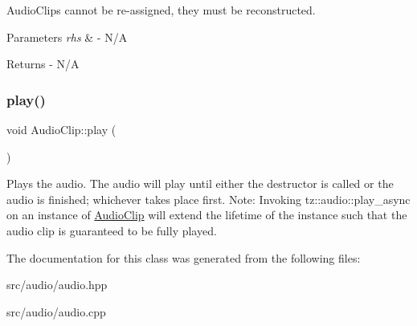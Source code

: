 Audio\+Clips cannot be re-\/assigned, they must be reconstructed. 
\begin{DoxyParams}{Parameters}
{\em rhs} & -\/ N/A \\
\hline
\end{DoxyParams}
\begin{DoxyReturn}{Returns}
-\/ N/A 
\end{DoxyReturn}
\mbox{\label{class_audio_clip_a615c3e8e6da9cdf8b98c1682135c2a75}} 
\subsubsection{\texorpdfstring{play()}{play()}}
{\footnotesize\ttfamily void Audio\+Clip\+::play (\begin{DoxyParamCaption}{ }\end{DoxyParamCaption})}

Plays the audio. The audio will play until either the destructor is called or the audio is finished; whichever takes place first. Note\+: Invoking tz\+::audio\+::play\+\_\+async on an instance of \mbox{\hyperlink{class_audio_clip}{Audio\+Clip}} will extend the lifetime of the instance such that the audio clip is guaranteed to be fully played. 

The documentation for this class was generated from the following files\+:\begin{DoxyCompactItemize}
\item 
src/audio/audio.\+hpp\item 
src/audio/audio.\+cpp\end{DoxyCompactItemize}
